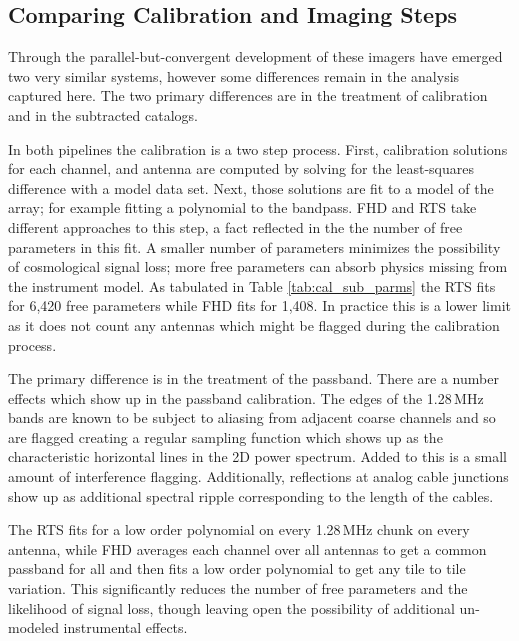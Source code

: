 \documentclass[twolcolumn,iop]{emulateapj}
\begin{document}
\subsection{Comparing Calibration and Imaging Steps}
\label{sec:comparing_imaging}
Through the parallel-but-convergent development of these imagers have emerged two very similar systems, however some differences remain in the analysis captured here. The two primary differences are in the treatment of calibration and in the subtracted catalogs.  

In both pipelines the calibration is a two step process. First, calibration solutions for each channel, and antenna are computed by solving for the least-squares difference with a model data set. Next, those solutions are fit to a model of the array; for example fitting a polynomial to the bandpass. FHD and RTS take different approaches to this step, a fact reflected in the the number of free parameters in this fit. A smaller number of parameters minimizes the possibility of cosmological signal loss; more free parameters can absorb physics missing from the instrument model.  As tabulated in Table \ref{tab:cal_sub_parms} the RTS fits for 6,420 free parameters while FHD fits for 1,408.  In practice this is a lower limit as it does not count any antennas which might be flagged during the calibration process. 

The primary difference is in the treatment of the passband.  There are a number effects which show up in the passband calibration. The edges of the 1.28\,MHz bands are known to be subject to aliasing from adjacent coarse channels and so are flagged creating a regular sampling function which shows up as the characteristic horizontal lines in the 2D power spectrum. Added to this is a small amount of interference flagging.  Additionally, reflections at analog cable junctions show up as additional spectral ripple corresponding to the length of the cables.    

The RTS fits for a low order polynomial on every 1.28\,MHz chunk on every antenna, while FHD averages each channel over all antennas to get a common passband for all and then fits a low order polynomial to get any tile to tile variation. This significantly reduces the number of free parameters and the likelihood of signal loss, though leaving open the possibility of additional un-modeled instrumental effects.
\end{document}
